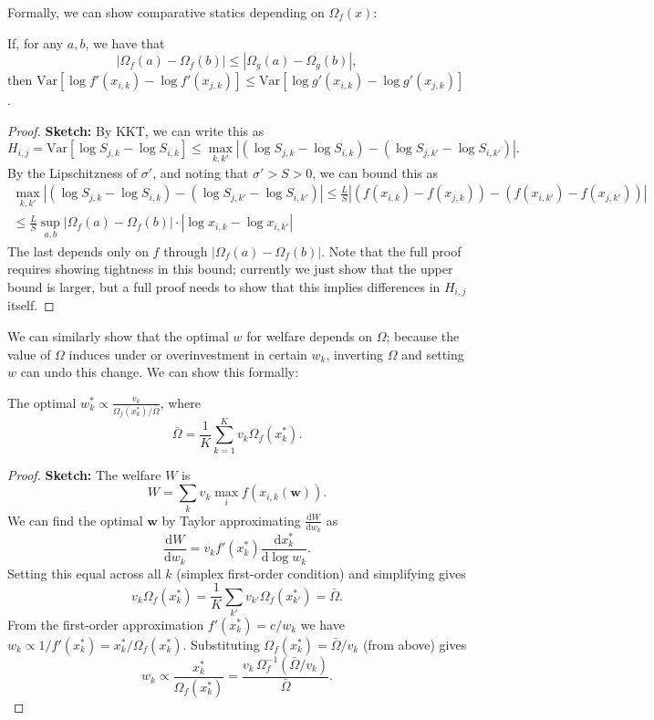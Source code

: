 \documentclass[msom,blindrev]{informs3_ExtAbst}
\begin{document}
Formally, we can show comparative statics depending on $\Omega_{f}(x)$: 
\begin{theorem}
    If, for any $a,b$, we have that 
    \[
    |\Omega_{f}(a)-\Omega_{f}(b)| \leq |\Omega_{g}(a)-\Omega_{g}(b)|,
    \]
    then $\mathrm{Var}[\log f'(x_{i,k})-\log f'(x_{j,k})] \leq \mathrm{Var}[\log g'(x_{i,k})-\log g'(x_{j,k})] $.
\end{theorem}
\begin{proof}
    \textbf{Sketch:} 
    By KKT, we can write this as 
    \[
    H_{i,j} = \mathrm{Var}[\log S_{j,k}-\log S_{i,k}] \leq \max_{k,k'} | (\log S_{j,k} - \log S_{i,k}) - (\log S_{j,k'}-\log S_{i,k'})|. 
    \]
    By the Lipschitzness of $\sigma'$, and noting that $\sigma' > S > 0$, we can bound this as 
    \begin{align} 
    \max_{k,k'} | (\log S_{j,k} - \log S_{i,k}) - (\log S_{j,k'}-\log S_{i,k'})| \leq \frac{L}{S}|(f(x_{i,k})-f(x_{j,k})) - (f(x_{i,k'})-f(x_{j,k'}))| \\ 
    \leq \frac{L}{S} \sup\limits_{a,b} | \Omega_{f}(a)-\Omega_{f}(b)| \cdot | \log x_{i,k}-\log x_{i,k'}|
    \end{align}
    The last depends only on $f$ through $|\Omega_{f}(a)-\Omega_{f}(b)|$. 
    Note that the full proof requires showing tightness in this bound; currently we just show that the upper bound is larger, but a full proof needs to show that this implies differences in $H_{i,j}$ itself. 
\end{proof}

We can similarly show that the optimal $w$ for welfare depends on $\Omega$; because the value of $\Omega$ induces under or overinvestment in certain $w_{k}$, inverting $\Omega$ and setting $w$ can undo this change. 
We can show this formally: 
\begin{theorem}
    The optimal $w^{*}_{k} \propto \frac{v_{k}}{\Omega_{f}(x^{*}_{k})/\bar{\Omega}}$, where
    \[
    \bar{\Omega} = \frac{1}{K} \sum_{k=1}^{K} v_{k} \Omega_{f}(x^{*}_{k}).
    \]
\end{theorem}
\begin{proof}
    \textbf{Sketch:} The welfare $W$ is 
    \[
    W = \sum_{k} v_{k} \max_{i} f(x_{i,k}(\mathbf{w})).
    \]
    We can find the optimal $\mathbf{w}$ by Taylor approximating $\frac{\mathrm{d}W}{\mathrm{d}w_k}$ as
    \[
    \frac{\mathrm{d}W}{\mathrm{d}w_k} = v_{k} f'(x^{*}_{k}) \frac{\mathrm{d} x^{*}_{k}}{\mathrm{d} \log w_{k}}.
    \]
    Setting this equal across all $k$ (simplex first-order condition) and simplifying gives
    \[
    v_{k} \Omega_{f}(x^{*}_{k}) = \frac{1}{K} \sum_{k'} v_{k'} \Omega_{f}(x^{*}_{k'}) = \bar{\Omega}.
    \]
    From the first-order approximation $f'(x^*_k) = c/w_k$ we have $w_k \propto 1/f'(x^*_k) = x^*_k/\Omega_f(x^*_k)$.  Substituting $\Omega_f(x^*_k) = \bar{\Omega}/v_k$ (from above) gives
    \[
    w_{k} \propto \frac{x^{*}_{k}}{\Omega_{f}(x^{*}_{k})} = \frac{v_k \, \Omega^{-1}_{f}(\bar{\Omega}/v_k)}{\bar{\Omega}}.
    \]
\end{proof}
\end{document}
